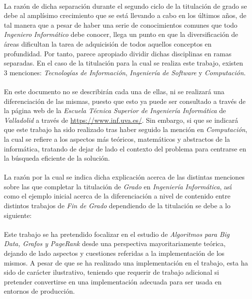 \documentclass{subfiles}
\begin{document}
      \paragraph{}
      La razón de dicha separación durante el segundo ciclo de la titulación de grado se debe al amplísimo crecimiento que se está llevando a cabo en los últimos años, de tal manera que a pesar de haber una serie de conocimientos comunes que todo \emph{Ingeniero Informático} debe conocer, llega un punto en que la diversificación de áreas dificultan la tarea de adquicisión de todos aquellos conceptos en profundidad. Por tanto, parece apropiado dividir dichas disciplinas en ramas separadas. En el caso de la titulación para la cual se realiza este trabajo, existen 3 menciones: \emph{Tecnologías de Información}, \emph{Ingeniería de Software} y \emph{Computación}.

      \paragraph{}
      En este documento no se describirán cada una de ellas, ni se realizará una diferenciación de las mismas, puesto que esto ya puede ser consultado a través de la página web de la \emph{Escuela Técnica Superior de Ingeniería Informática} de \emph{Valladolid} a través de \url{https://www.inf.uva.es/}. Sin embargo, si que se indicará que este trabajo ha sido realizado tras haber seguido la mención en \emph{Computación}, la cual se refiere a los aspectos más teóricos, matemáticos y abstractos de la informática, tratando de dejar de lado el contexto del problema para centrarse en la búsqueda eficiente de la solución.

      \paragraph{}
      La razón por la cual se indica dicha explicación acerca de las distintas menciones sobre las que completar la titulación de \emph{Grado} en \emph{Ingeniería Informática}, así como el ejemplo inicial acerca de la diferenciación a nivel de contenido entre distintos trabajos de \emph{Fin de Grado} dependiendo de la titulación se debe a lo siguiente:

      \paragraph{}
      Este trabajo se ha pretendido focalizar en el estudio de \emph{Algoritmos para Big Data, Grafos y PageRank} desde una perspectiva mayoritariamente teórica, dejando de lado aspectos y cuestiones referidas a la implementación de los mismos. A pesar de que se ha realizado una implementación en el trabajo, esta ha sido de carácter ilustrativo, teniendo que requerir de trabajo adicional si pretender convertirse en una implementación adecuada para ser usada en entornos de producción.
\end{document}
